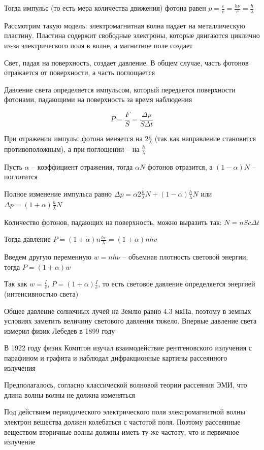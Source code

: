 \documentclass[12pt]{article}
\begin{document}
Тогда импульс (то есть мера количества движения) фотона равен $p = \frac{\varepsilon}{c} = \frac{h \nu}{c} = \frac{h}{\lambda}$

Рассмотрим такую модель: электромагнитная волна падает на металлическую пластину. Пластина содержит свободные электроны, которые двигаются циклично из-за электрического поля в волне, а магнитное поле создает 

Свет, падая на поверхность, создает давление. В общем случае, часть фотонов отражается от поверхности, а часть поглощается

Давление света определяется импульсом, который передается поверхности фотонами, падающими на поверхность за время наблюдения

\[P = \frac{F}{S} = \frac{\Delta p}{S \Delta t}\]

При отражении импульс фотона меняется на $2 \frac{h}{\lambda}$ (так как направление становится противоположным), а при поглощении -- на $\frac{h}{\lambda}$

Пусть $\alpha$ -- коэффициент отражения, тогда $\alpha N$ фотонов отразится, а $(1 - \alpha) N$ -- поглотится

Полное изменение импульса равно $\Delta p = \alpha 2\frac{h}{\lambda} N + (1 - \alpha) \frac{h}{\lambda} N$ или $\Delta p = (1 + \alpha) \frac{h}{\lambda} N$

Количество фотонов, падающих на поверхность, можно выразить так: $N = n S c \Delta t$

Тогда давление $P = (1 + \alpha) n \frac{h c}{\lambda} = (1 + \alpha) n h v$

Введем другую переменную $w = n h \nu$ -- объемная плотность световой энергии, тогда $P = (1 + \alpha) w$

Так как $w = \frac{I}{c}$, $P = (1 + \alpha) \frac{I}{c}$, то есть световое давление определяется энергией (интенсивностью света)

Общее давление солнечных лучей на Землю равно $4.3$ мкПа, поэтому в земных условиях заметить величину светового давления тяжело. Впервые давление света измерил физик Лебедев в 1899 году

\mediumvspace

В 1922 году физик Комптон изучал взаимодействие рентгеновского излучения с парафином и графита и наблюдал дифракционные картины рассеянного излучения

Предполагалось, согласно классической волновой теории рассеяния ЭМИ, что длина волны волны не должна изменяться

Под действием периодического электрического поля электромагнитной волны электрон вещества должен колебаться с частотой поля. Поэтому рассеянные веществом вторичные волны должны иметь ту же частоту, что и первичное излучение
\end{document}

